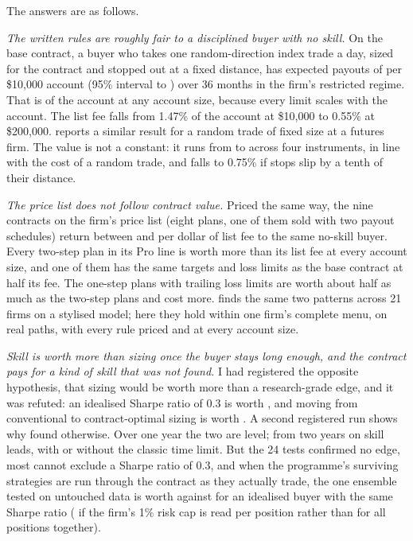 \documentclass[11pt]{article}
\begin{document}
The answers are as follows.

\emph{The written rules are roughly fair to a disciplined buyer with no skill.} On the base contract, a buyer who
takes one random-direction index trade a day, sized for the contract and stopped out at a fixed distance, has
expected payouts of \Vcoin{} per \$10,000 account (95\% interval \VcoinLo{} to \VcoinHi{}) over 36 months in the
firm's restricted regime. That is \VcoinPct{} of the account at any account size, because every limit scales with
the account. The list fee falls from 1.47\% of the account at \$10,000 to 0.55\% at \$200,000.
\citet{youngblood2026} reports a similar result for a random trade of fixed size at a futures firm. The value is not a
constant: it runs from \BookLo{} to \BookHi{} across four instruments, in line with the cost of a random trade,
and falls to 0.75\% if stops slip by a tenth of their distance.

\emph{The price list does not follow contract value.} Priced the same way, the nine contracts on the firm's price
list (eight plans, one of them sold with two payout schedules) return between \PerFeeMin{} and \PerFeeMax{} per
dollar of list fee to the same no-skill buyer. Every two-step plan in its Pro line is worth more than its list fee
at every account size, and one of them has the same targets and
loss limits as the base contract at half its fee. The one-step plans with trailing loss limits are worth about
half as much as the two-step plans and cost more. \citet{lim2026b} finds the same two patterns across 21 firms on a
stylised model; here they hold within one firm's complete menu, on real paths, with every rule priced and at every
account size.

\emph{Skill is worth more than sizing once the buyer stays long enough, and the contract pays for a kind of skill
that was not found.} I had registered the opposite hypothesis, that sizing would be worth more than a research-grade
edge, and it was refuted: an idealised Sharpe ratio of 0.3 is worth \Vskill{}, and moving from conventional to
contract-optimal sizing is worth \SizingGain{}. A second registered run shows why \citet{lim2026} found otherwise.
Over one year the two are level; from two years on skill leads, with or without the classic time limit. But the
24 tests confirmed no edge, most cannot exclude a Sharpe ratio of 0.3, and when the programme's surviving
strategies are run through the contract as they actually trade, the one ensemble tested on untouched data is
worth \VRthreeLate{} against \IdealRthreeLate{} for an idealised buyer with the same Sharpe ratio (\VRthreeLatePos{}
if the firm's 1\% risk cap is read per position rather than for all positions together).
\end{document}
